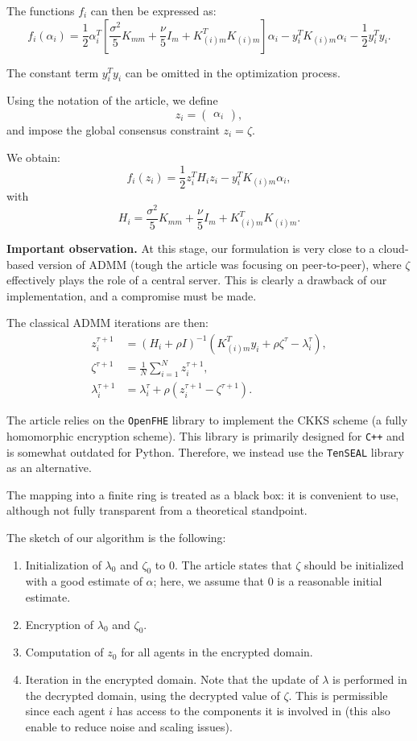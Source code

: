 \documentclass[10pt,english]{article}
\begin{document}
The functions $f_i$ can then be expressed as:
\begin{equation}
    f_i(\alpha_i)=\frac{1}{2}\alpha_i^T\left[\frac{\sigma^2}{5}K_{mm}+\frac{\nu}{5}I_m+K_{(i)m}^T K_{(i)m}\right]\alpha_i
    - y_i^T K_{(i)m}\alpha_i - \frac{1}{2}y_i^T y_i.
\end{equation}

The constant term $y_i^T y_i$ can be omitted in the optimization process. 

Using the notation of the article, we define
\[
z_i = \begin{pmatrix} \alpha_i \end{pmatrix},
\]
and impose the global consensus constraint $z_i = \zeta$.

We obtain:
\[
f_i(z_i)=\frac{1}{2}z_i^T H_i z_i - y_i^T K_{(i)m}\alpha_i,
\]
with
\[
H_i=\frac{\sigma^2}{5}K_{mm}+\frac{\nu}{5}I_m+K_{(i)m}^T K_{(i)m}.
\]

\textbf{Important observation.} At this stage, our formulation is very close to a cloud-based version of ADMM (tough the article was focusing on peer-to-peer), where $\zeta$ effectively plays the role of a central server. This is clearly a drawback of our implementation, and a compromise must be made.

The classical ADMM iterations are then:
\begin{align}
z_i^{\tau+1} &= \left( H_i + \rho I \right)^{-1} \left( K_{(i)m}^T y_i + \rho \zeta^\tau - \lambda_i^\tau \right), \\
\zeta^{\tau+1} &= \frac{1}{N} \sum_{i=1}^{N} z_i^{\tau+1}, \\
\lambda_i^{\tau+1} &= \lambda_i^\tau + \rho \left( z_i^{\tau+1} - \zeta^{\tau+1} \right).
\end{align}

The article relies on the \lstinline{OpenFHE} library to implement the CKKS scheme (a fully homomorphic encryption scheme). This library is primarily designed for \lstinline{C++} and is somewhat outdated for Python. Therefore, we instead use the \lstinline{TenSEAL} library as an alternative.

The mapping into a finite ring is treated as a black box: it is convenient to use, although not fully transparent from a theoretical standpoint.

The sketch of our algorithm is the following:
\begin{enumerate}
    \item Initialization of $\lambda_0$ and $\zeta_0$ to $0$. The article states that $\zeta$ should be initialized with a good estimate of $\alpha$; here, we assume that $0$ is a reasonable initial estimate.
    \item Encryption of $\lambda_0$ and $\zeta_0$.
    \item Computation of $z_0$ for all agents in the encrypted domain.
    \item Iteration in the encrypted domain. Note that the update of $\lambda$ is performed in the decrypted domain, using the decrypted value of $\zeta$. This is permissible since each agent $i$ has access to the components it is involved in (this also enable to reduce noise and scaling issues).
\end{enumerate}
\end{document}
